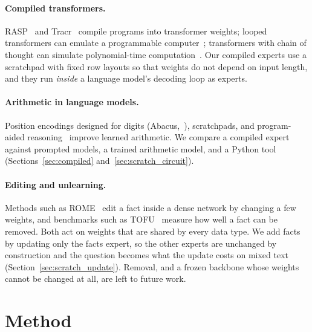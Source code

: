 \documentclass[10pt]{article}
\begin{document}
\paragraph{Compiled transformers.} RASP~\citep{weiss2021rasp} and Tracr~\citep{lindner2023tracr}
compile programs into transformer weights; looped transformers can emulate a programmable
computer~\citep{giannou2023looped}; transformers with chain of thought can simulate
polynomial-time computation~\citep{merrill2024cot}. Our compiled experts use a scratchpad with
fixed row layouts so that weights do not depend on input length, and they run \emph{inside} a
language model's decoding loop as experts.

\paragraph{Arithmetic in language models.} Position encodings designed for digits
(Abacus,~\citealp{mcleish2024abacus}), scratchpads, and program-aided
reasoning~\citep{gao2023pal} improve learned arithmetic. We compare a compiled expert against
prompted models, a trained arithmetic model, and a Python tool (Sections~\ref{sec:compiled}
and~\ref{sec:scratch_circuit}).

\paragraph{Editing and unlearning.} Methods such as ROME~\citep{meng2022rome} edit a fact
inside a dense network by changing a few weights, and benchmarks such as
TOFU~\citep{maini2024tofu} measure how well a fact can be removed. Both act on weights that are
shared by every data type. We add facts by updating only the facts expert, so the other experts
are unchanged by construction and the question becomes what the update costs on mixed text
(Section~\ref{sec:scratch_update}). Removal, and a frozen backbone whose weights cannot be
changed at all, are left to future work.

\section{Method}
\label{sec:method}
\end{document}
